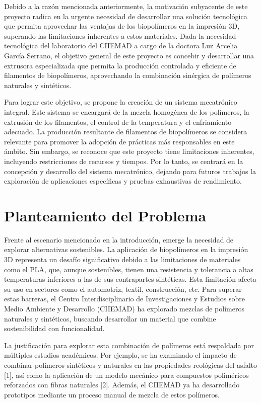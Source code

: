 \documentclass[14pt,oneside]{extarticle} %
\begin{document}
Debido a la razón mencionada anteriormente, la motivación subyacente de este proyecto radica en la urgente necesidad de desarrollar una solución tecnológica que permita aprovechar las ventajas de los biopolímeros en la impresión 3D, superando las limitaciones inherentes a estos materiales. Dada la necesidad tecnológica del laboratorio del CIIEMAD a cargo de la doctora Luz Arcelia García Serrano, el objetivo general de este proyecto es concebir y desarrollar una extrusora especializada que permita la producción controlada y eficiente de filamentos de biopolímeros, aprovechando la combinación sinérgica de polímeros naturales y sintéticos. 

Para lograr este objetivo, se propone la creación de un sistema mecatrónico integral. Este sistema se encargará de la mezcla homogénea de los polímeros, la extrusión de los filamentos, el control de la temperatura y el enfriamiento adecuado. La producción resultante de filamentos de biopolímeros se considera relevante para promover la adopción de prácticas más responsables en este ámbito. Sin embargo, se reconoce que este proyecto tiene limitaciones inherentes, incluyendo restricciones de recursos y tiempos. Por lo tanto, se centrará en la concepción y desarrollo del sistema mecatrónico, dejando para futuros trabajos la exploración de aplicaciones específicas y pruebas exhaustivas de rendimiento.

\section{Planteamiento del Problema}

Frente al escenario mencionado en la introducción, emerge la necesidad de explorar alternativas sostenibles. La aplicación de biopolímeros en la impresión 3D representa un desafío significativo debido a las limitaciones de materiales como el PLA, que, aunque sostenibles, tienen una resistencia y tolerancia a altas temperaturas inferiores a las de sus contrapartes sintéticas. Esta limitación afecta su uso en sectores como el automotriz, textil, construcción, etc. Para superar estas barreras, el Centro Interdisciplinario de Investigaciones y Estudios sobre Medio Ambiente y Desarrollo (CIIEMAD) ha explorado mezclas de polímeros naturales y sintéticos, buscando desarrollar un material que combine sostenibilidad con funcionalidad.

La justificación para explorar esta combinación de polímeros está respaldada por múltiples estudios académicos. Por ejemplo, se ha examinado el impacto de combinar polímeros sintéticos y naturales en las propiedades reológicas del asfalto [1], así como la aplicación de un modelo mecánico para compuestos poliméricos reforzados con fibras naturales [2]. Además, el CIIEMAD ya ha desarrollado prototipos mediante un proceso manual de mezcla de estos polímeros.
\end{document}
